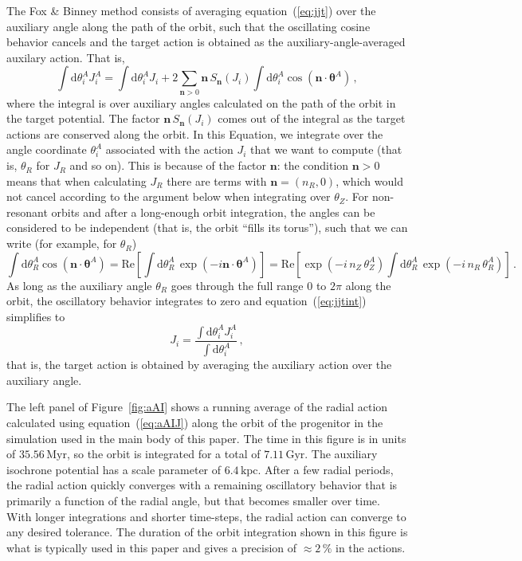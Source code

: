 \documentclass[12pt,preprint]{aastex}
\newcommand{\dd}{\mathrm{d}}
\newcommand{\eqnname}{equation}
\renewcommand{\figurename}{Figure}
\renewcommand{\vec}[1]{\ensuremath{\mathbf{#1}}}
\newcommand{\vecn}{\ensuremath{\vec{n}}}
\newcommand{\veca}{\ensuremath{\boldsymbol\theta}}
\newcommand{\Myr}{\ensuremath{\,\mathrm{Myr}}}
\newcommand{\Gyr}{\ensuremath{\,\mathrm{Gyr}}}
\newcommand{\kpc}{\ensuremath{\,\mathrm{kpc}}}
\begin{document}
The Fox \& Binney method consists of averaging \eqnname~(\ref{eq:jjt})
over the auxiliary angle along the path of the orbit, such that the
oscillating cosine behavior cancels and the target action is obtained
as the auxiliary-angle-averaged auxilary action. That is,
\begin{equation}\label{eq:jjtint}
  \int \dd \theta_i^A J_i^A = \int \dd \theta_i^A J_i + 2 \sum_{\vecn > 0} \vecn\,S_{\vecn}(J_i)\int \dd \theta_i^A\cos(\vecn\cdot\veca^A)\,,
\end{equation}
where the integral is over auxiliary angles calculated on the path of
the orbit in the target potential. The factor $\vecn\,S_{\vecn}(J_i)$
comes out of the integral as the target actions are conserved along
the orbit. In this Equation, we integrate over the angle coordinate
$\theta_i^A$ associated with the action $J_i$ that we want to compute
(that is, $\theta_R$ for $J_R$ and so on). This is because of the
factor $\vecn$: the condition $\vecn > 0$ means that when calculating
$J_R$ there are terms with $\vecn = (n_R,0)$, which would not cancel
according to the argument below when integrating over $\theta_Z$. For
non-resonant orbits and after a long-enough orbit integration, the
angles can be considered to be independent (that is, the orbit ``fills
its torus''), such that we can write (for example, for $\theta_R$)
\begin{equation}
  \int \dd \theta_R^A\cos(\vecn\cdot\veca^A) = \mathrm{Re}\left[\int \dd \theta_R^A\,\exp(-i\vecn\cdot\veca^A)\right] = \mathrm{Re}\left[\exp(-i\,n_Z\,\theta^A_Z)\int \dd \theta_R^A\,\exp(-i\,n_R\,\theta^A_R)\right]\,.
\end{equation}
As long as the auxiliary angle $\theta_R$ goes through the full range
$0$ to $2\pi$ along the orbit, the oscillatory behavior integrates to
zero and \eqnname~(\ref{eq:jjtint}) simplifies to
\begin{equation}\label{eq:aAIJ}
  J_i = \frac{\int \dd \theta_i^A J_i^A}{\int \dd \theta_i^A}\,,
\end{equation}
that is, the target action is obtained by averaging the auxiliary
action over the auxiliary angle.

The left panel of \figurename~\ref{fig:aAI} shows a running average of
the radial action calculated using \eqnname~(\ref{eq:aAIJ}) along the
orbit of the progenitor in the simulation used in the main body of
this paper. The time in this figure is in units of $35.56\Myr$, so the
orbit is integrated for a total of $7.11\Gyr$. The auxiliary isochrone
potential has a scale parameter of $6.4\kpc$. After a few radial
periods, the radial action quickly converges with a remaining
oscillatory behavior that is primarily a function of the radial angle,
but that becomes smaller over time. With longer integrations and
shorter time-steps, the radial action can converge to any desired
tolerance. The duration of the orbit integration shown in this figure
is what is typically used in this paper and gives a precision of
$\approx2\,\%$ in the actions.
\end{document}
